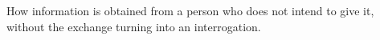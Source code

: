 
\begin{chapterblurb}
How information is obtained from a person who does not intend to give it, without the exchange turning into an interrogation.
\end{chapterblurb}
